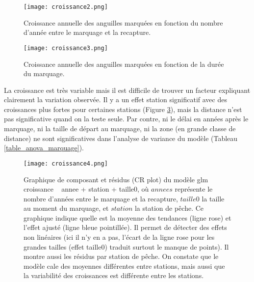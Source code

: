 \documentclass[10pt,twocolumn,titlepage,twoside]{article}\usepackage[]{graphicx}\usepackage[]{xcolor}
\begin{document}
\begin{figure}[htbp]
\centering
\texttt{[image: croissance2.png]}
\caption[Croissance annuelles des anguilles marquées]{Croissance annuelle des
anguilles marquées en fonction du nombre d'année entre le marquage et la
recapture.}
\label{croissance2}
\end{figure}


\begin{figure}[htbp]
\centering
\texttt{[image: croissance3.png]}
\caption[Croissance annuelles des anguilles marquées]{Croissance annuelle des
anguilles marquées en fonction de la durée du marquage.}
\label{croissance3}
\end{figure}


La croissance est très variable mais il est difficile de trouver un facteur
expliquant clairement la variation observée. Il y a un effet station significatif avec des croissances plus fortes
pour certaines stations (Figure \ref{croissance4}), mais la distance n'est pas significative
quand on la teste seule. Par contre, ni le délai en années après le
marquage, ni la taille de départ au marquage, ni la zone (en grande
classe de distance) ne sont significatives dans l'analyse de variance du
modèle (Tableau \ref{table_anova_marquage}). 



\begin{figure}[htbp]
\centering
\texttt{[image: croissance4.png]}
\caption[Graphique de composant et résidus du modèle glm croissance ~ annee +
station + taille initiale.]{Graphique de composant et résidus (CR plot) du
modèle glm croissance ~ annee + station + taille0, où $annees$ représente le
nombre d'années entre le marquage et la recapture, $taille0$ la taille au moment
du marquage, et $station$ la station de pêche. Ce graphique indique quelle est la
moyenne des tendances (ligne rose) et l'effet ajusté (ligne bleue
pointillée).
Il permet de détecter des effets non linéaires (ici il n'y en a pas, l'écart de
la ligne rose pour les grandes tailles
(effet taille0) traduit surtout le manque de points). Il montre aussi les
résidus par station de pêche. On constate que le modèle cale des moyennes
différentes entre stations, mais aussi que la variabilité des croissances est
différente entre les stations.}
\label{croissance4}
\end{figure}


\end{document}
